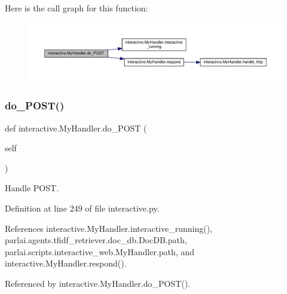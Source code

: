 Here is the call graph for this function\+:
\nopagebreak
\begin{figure}[H]
\begin{center}
\leavevmode
\includegraphics[width=350pt]{classinteractive_1_1MyHandler_a59070990ac52dada4b7c532f76af749f_cgraph}
\end{center}
\end{figure}
\mbox{\label{classinteractive_1_1MyHandler_a59070990ac52dada4b7c532f76af749f}} 
\subsubsection{\texorpdfstring{do\+\_\+\+P\+O\+S\+T()}{do\_POST()}\hspace{0.1cm}{\footnotesize\ttfamily [2/2]}}
{\footnotesize\ttfamily def interactive.\+My\+Handler.\+do\+\_\+\+P\+O\+ST (\begin{DoxyParamCaption}\item[{}]{self }\end{DoxyParamCaption})}

\begin{DoxyVerb}Handle POST.\end{DoxyVerb}
 

Definition at line 249 of file interactive.\+py.



References interactive.\+My\+Handler.\+interactive\+\_\+running(), parlai.\+agents.\+tfidf\+\_\+retriever.\+doc\+\_\+db.\+Doc\+D\+B.\+path, parlai.\+scripts.\+interactive\+\_\+web.\+My\+Handler.\+path, and interactive.\+My\+Handler.\+respond().



Referenced by interactive.\+My\+Handler.\+do\+\_\+\+P\+O\+S\+T().


